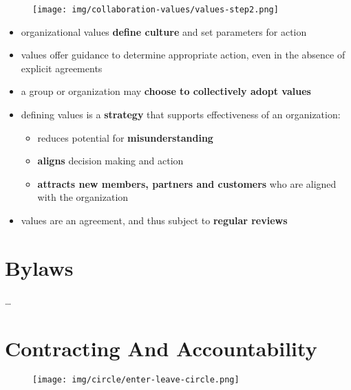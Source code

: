 \begin{figure}[htbp]
\centering
\texttt{[image: img/collaboration-values/values-step2.png]}
\end{figure}

\begin{itemize}
\item organizational values \textbf{define culture} and set parameters for action

\item values offer guidance to determine appropriate action, even in the absence of explicit agreements

\item a group or organization may \textbf{choose to collectively adopt values}

\item defining values is a \textbf{strategy} that supports effectiveness of an organization:

\begin{itemize}
\item reduces potential for \textbf{misunderstanding}

\item \textbf{aligns} decision making and action

\item \textbf{attracts new members, partners and customers} who are aligned with the organization

\end{itemize}

\item values are an agreement, and thus subject to \textbf{regular reviews}

\end{itemize}

\section{Bylaws}
\label{bylaws}

{\ldots}

\section{Contracting And Accountability}
\label{contractingandaccountability}

\begin{figure}[htbp]
\centering
\texttt{[image: img/circle/enter-leave-circle.png]}
\end{figure}

